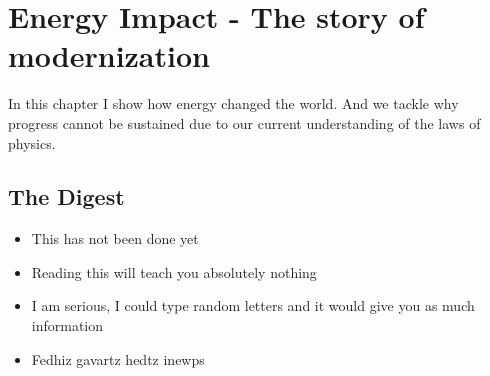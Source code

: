 \setchapterpreamble[u]{\margintoc}
\chapter{Energy Impact - The story of modernization}

In this chapter I show how energy changed the world. And we tackle why progress cannot be sustained due to our current understanding of the laws of physics.


\blindtext


\section{The Digest}


\begin{kaoboxgreen}[frametitle=Main Takeaways]

\begin{itemize}
\item This has not been done yet
\item Reading this will teach you absolutely nothing
\item I am serious, I could type random letters and it would give you as much information
\item Fedhiz gavartz hedtz inewps
\end{itemize}
  
\end{kaoboxgreen}